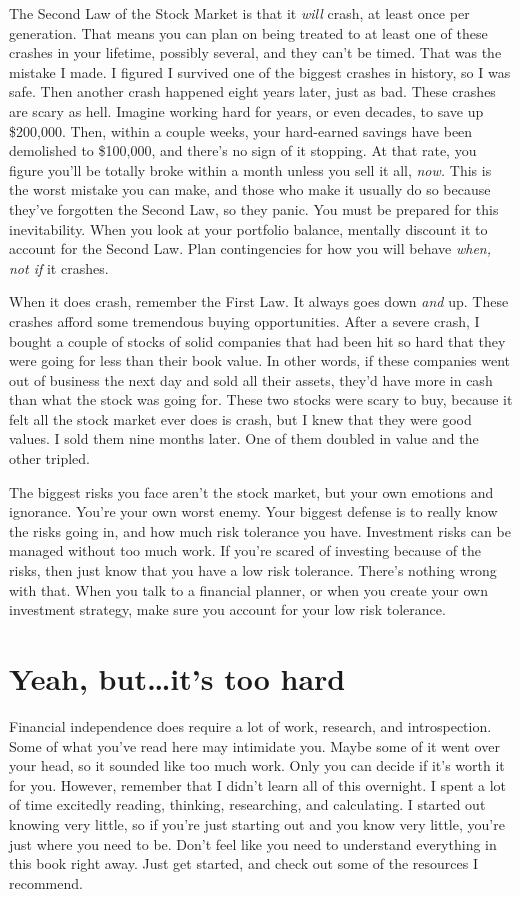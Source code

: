 The Second Law of the Stock Market is that it \emph{will} crash, at least once per generation. That means you can plan on being treated to at least one of these crashes in your lifetime, possibly several, and they can't be timed. That was the mistake I made. I figured I survived one of the biggest crashes in history, so I was safe. Then another crash happened eight years later, just as bad. These crashes are scary as hell. Imagine working hard for years, or even decades, to save up \$200,000. Then, within a couple weeks, your hard-earned savings have been demolished to \$100,000, and there's no sign of it stopping. At that rate, you figure you'll be totally broke within a month unless you sell it all, \emph{now.} This is the worst mistake you can make, and those who make it usually do so because they've forgotten the Second Law, so they panic. You must be prepared for this inevitability. When you look at your portfolio balance, mentally discount it to account for the Second Law. Plan contingencies for how you will behave \emph{when, not if} it crashes.

When it does crash, remember the First Law. It always goes down \emph{and} up. These crashes afford some tremendous buying opportunities. After a severe crash, I bought a couple of stocks of solid companies that had been hit so hard that they were going for less than their book value. In other words, if these companies went out of business the next day and sold all their assets, they'd have more in cash than what the stock was going for. These two stocks were scary to buy, because it felt all the stock market ever does is crash, but I knew that they were good values. I sold them nine months later. One of them doubled in value and the other tripled.

The biggest risks you face aren't the stock market, but your own emotions and ignorance. You're your own worst enemy. Your biggest defense is to really know the risks going in, and how much risk tolerance you have. Investment risks can be managed without too much work. If you're scared of investing because of the risks, then just know that you have a low risk tolerance. There's nothing wrong with that. When you talk to a financial planner, or when you create your own investment strategy, make sure you account for your low risk tolerance.

\section{Yeah, but\ldots it's too hard}
Financial independence does require a lot of work, research, and introspection. Some of what you've read here may intimidate you. Maybe some of it went over your head, so it sounded like too much work. Only you can decide if it's worth it for you. However, remember that I didn't learn all of this overnight. I spent a lot of time excitedly reading, thinking, researching, and calculating. I started out knowing very little, so if you're just starting out and you know very little, you're just where you need to be. Don't feel like you need to understand everything in this book right away. Just get started, and check out some of the resources I recommend.

